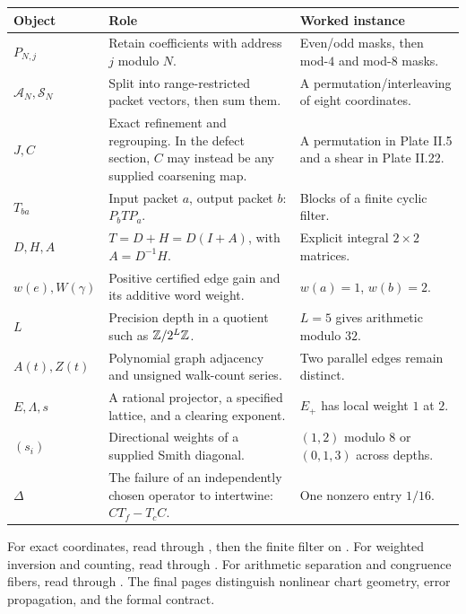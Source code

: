 {\small
\begin{tabularx}{\linewidth}{@{}p{.15\linewidth}Yp{.28\linewidth}@{}}\toprule
\textbf{Object} & \textbf{Role} & \textbf{Worked instance}\\\midrule
$P_{N,j}$ & Retain coefficients with address $j$ modulo $N$. & Even/odd masks, then mod-$4$ and mod-$8$ masks.\\
$\mathcal A_N,\mathcal S_N$ & Split into range-restricted packet vectors, then sum them. & A permutation/interleaving of eight coordinates.\\
$J,C$ & Exact refinement and regrouping. In the defect section, $C$ may instead be any supplied coarsening map. & A permutation in Plate II.5 and a shear in Plate II.22.\\
$T_{ba}$ & Input packet $a$, output packet $b$: $P_bTP_a$. & Blocks of a finite cyclic filter.\\
$D,H,A$ & $T=D+H=D(I+A)$, with $A=D^{-1}H$. & Explicit integral $2\times2$ matrices.\\
$w(e),W(\gamma)$ & Positive certified edge gain and its additive word weight. & $w(a)=1$, $w(b)=2$.\\
$L$ & Precision depth in a quotient such as $\mathbb Z/2^L\mathbb Z$. & $L=5$ gives arithmetic modulo $32$.\\
$A(t),Z(t)$ & Polynomial graph adjacency and unsigned walk-count series. & Two parallel edges remain distinct.\\
$E,\Lambda,s$ & A rational projector, a specified lattice, and a clearing exponent. & $E_+$ has local weight $1$ at $2$.\\
$(s_i)$ & Directional weights of a supplied Smith diagonal. & $(1,2)$ modulo $8$ or $(0,1,3)$ across depths.\\
$\Delta$ & The failure of an independently chosen operator to intertwine: $CT_f-T_cC$. & One nonzero entry $1/16$.\\\bottomrule
\end{tabularx}}

For exact coordinates, read  through , then the finite filter on . For weighted inversion and counting, read  through . For arithmetic separation and congruence fibers, read  through . The final pages distinguish nonlinear chart geometry, error propagation, and the formal contract.



